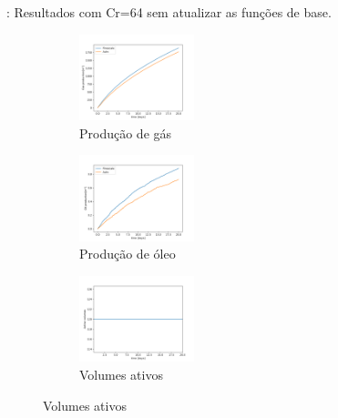 \documentclass[professionalfont]{beamer}
\begin{document}
\begin{frame}{\FrameProblemName: {\small Resultados com Cr=64 sem atualizar as funções de base.}}
    \begin{figure}[!ht]
        \centering
        
        \begin{subfigure}{.48\textwidth}
            \centering
            \includegraphics[height=2.5cm]{./imgs/pr3/cr64/no_update/svgtopng/gas_prod.png}
            \caption{Produção de gás}
        \end{subfigure}
        \hfill
        \begin{subfigure}{.48\textwidth}
            \centering
            \includegraphics[height=2.5cm]{./imgs/pr3/cr64/no_update/svgtopng/oil_prod.png}
            \caption{Produção de óleo}
        \end{subfigure}
        \bigskip
        \begin{subfigure}{\textwidth}
            \centering
            \includegraphics[height=2.5cm]{./imgs/pr3/cr64/no_update/svgtopng/volumes_ativos.png}
            \caption{Volumes ativos}
        \end{subfigure}
        
    \end{figure}
\end{frame}
\end{document}
